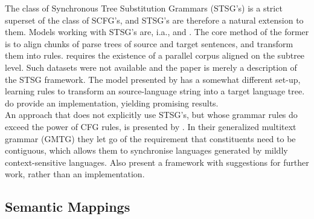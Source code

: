 The class of Synchronous Tree Substitution Grammars (STSG's) is a strict superset of the class of SCFG's, and STSG's are therefore a natural extension to them. Models working with STSG's are, i.a., \cite{poutsma2000data} and \cite{galley2004s,galley2006scalable}. The core method of the former is to align chunks of parse trees of source and target sentences, and transform them into rules. \cite{poutsma2000data} requires the existence of a parallel corpus aligned on the subtree level. Such datasets were not available and the paper is merely a description of the STSG framework.  The model presented by \citeauthor{galley2004s} has a somewhat different set-up, learning rules to transform an source-language string into a target language tree. \cite{galley2006scalable} do provide an implementation, yielding promising results.\\
An approach that does not explicitly use STSG's, but whose grammar rules do exceed the power of CFG rules, is presented by \cite{melamed2004generalized}. In their generalized multitext grammar (GMTG) they let go of the requirement that constituents need to be contiguous, which allows them to synchronise languages generated by mildly context-sensitive languages. Also \citeauthor{melamed2004generalized} present a framework with suggestions for further work, rather than an implementation.

\subsection{Semantic Mappings}

